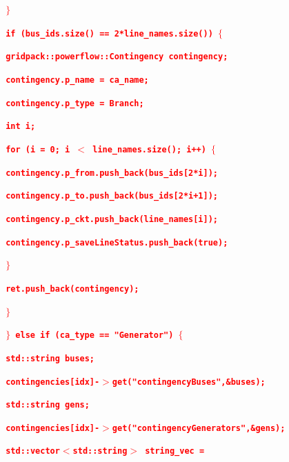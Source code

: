 \documentclass[12pt]{report} %
\begin{document}
\textcolor{red}{\texttt{\textbf{      $\boldsymbol{\mathrm{\}}}$}}}

\textcolor{red}{\texttt{\textbf{      if (bus\_ids.size() == 2*line\_names.size()) $\boldsymbol{\mathrm{\{}}$}}}

\textcolor{red}{\texttt{\textbf{        gridpack::powerflow::Contingency contingency;}}}

\textcolor{red}{\texttt{\textbf{        contingency.p\_name = ca\_name;}}}

\textcolor{red}{\texttt{\textbf{        contingency.p\_type = Branch;}}}

\textcolor{red}{\texttt{\textbf{        int i;}}}

\textcolor{red}{\texttt{\textbf{        for (i = 0; i $\boldsymbol{\mathrm{<}}$ line\_names.size(); i++) $\boldsymbol{\mathrm{\{}}$}}}

\textcolor{red}{\texttt{\textbf{          contingency.p\_from.push\_back(bus\_ids[2*i]);}}}

\textcolor{red}{\texttt{\textbf{          contingency.p\_to.push\_back(bus\_ids[2*i+1]);}}}

\textcolor{red}{\texttt{\textbf{          contingency.p\_ckt.push\_back(line\_names[i]);}}}

\textcolor{red}{\texttt{\textbf{          contingency.p\_saveLineStatus.push\_back(true);}}}

\textcolor{red}{\texttt{\textbf{        $\boldsymbol{\mathrm{\}}}$}}}

\textcolor{red}{\texttt{\textbf{        ret.push\_back(contingency);}}}

\textcolor{red}{\texttt{\textbf{      $\boldsymbol{\mathrm{\}}}$}}}

\textcolor{red}{\texttt{\textbf{    $\boldsymbol{\mathrm{\}}}$ else if (ca\_type == "Generator") $\boldsymbol{\mathrm{\{}}$}}}

\textcolor{red}{\texttt{\textbf{      std::string buses;}}}

\textcolor{red}{\texttt{\textbf{      contingencies[idx]-$\boldsymbol{\mathrm{>}}$get("contingencyBuses",\&buses);}}}

\textcolor{red}{\texttt{\textbf{      std::string gens;}}}

\textcolor{red}{\texttt{\textbf{      contingencies[idx]-$\boldsymbol{\mathrm{>}}$get("contingencyGenerators",\&gens);}}}

\textcolor{red}{\texttt{\textbf{      std::vector$\boldsymbol{\mathrm{<}}$std::string$\boldsymbol{\mathrm{>}}$ string\_vec =}}}
\end{document}
